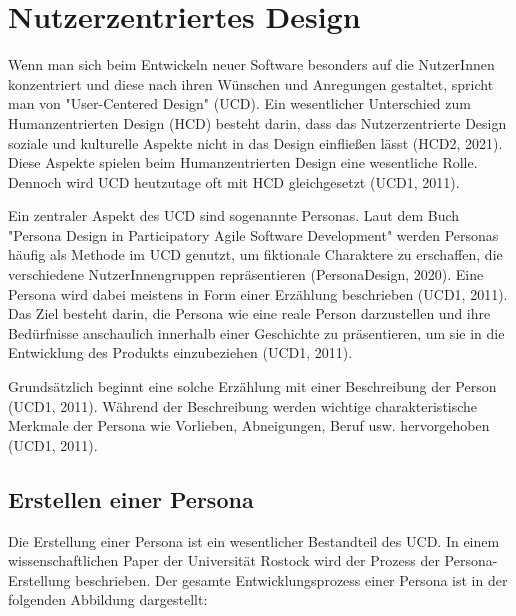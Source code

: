 \section{Nutzerzentriertes Design}

Wenn man sich beim Entwickeln neuer Software besonders auf die NutzerInnen konzentriert und diese nach ihren Wünschen und Anregungen gestaltet, spricht man von "User-Centered Design" (\acs{UCD}). Ein wesentlicher Unterschied zum Humanzentrierten Design (\acs{HCD}) besteht darin, dass das Nutzerzentrierte Design soziale und kulturelle Aspekte nicht in das Design einfließen lässt (HCD2, 2021). Diese Aspekte spielen beim Humanzentrierten Design eine wesentliche Rolle. Dennoch wird \acs{UCD} heutzutage oft mit \acs{HCD} gleichgesetzt (UCD1, 2011).



Ein zentraler Aspekt des \acs{UCD} sind sogenannte Personas. Laut dem Buch "Persona Design in Participatory Agile Software Development" werden Personas häufig als Methode im \acs{UCD} genutzt, um fiktionale Charaktere zu erschaffen, die verschiedene NutzerInnengruppen repräsentieren (PersonaDesign, 2020). Eine Persona wird dabei meistens in Form einer Erzählung beschrieben (UCD1, 2011). Das Ziel besteht darin, die Persona wie eine reale Person darzustellen und ihre Bedürfnisse anschaulich innerhalb einer Geschichte zu präsentieren, um sie in die Entwicklung des Produkts einzubeziehen (UCD1, 2011).

Grundsätzlich beginnt eine solche Erzählung mit einer Beschreibung der Person (UCD1, 2011). Während der Beschreibung werden wichtige charakteristische Merkmale der Persona wie Vorlieben, Abneigungen, Beruf usw. hervorgehoben (UCD1, 2011).

\subsection{Erstellen einer Persona}
Die Erstellung einer Persona ist ein wesentlicher Bestandteil des \acs{UCD}. In einem wissenschaftlichen Paper der Universität Rostock wird der Prozess der Persona-Erstellung beschrieben. Der gesamte Entwicklungsprozess einer Persona ist in der folgenden Abbildung dargestellt:

